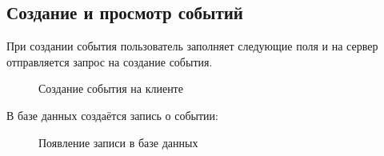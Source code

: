 \documentclass[diploma]{SCWorks}
\begin{document}
\subsection{Создание и просмотр событий}

При создании события пользователь заполняет следующие поля и на сервер 
отправляется запрос на создание события.

\begin{figure}[H]
	\caption{Создание события на клиенте}
	\label{pic:creation-frontend}
\end{figure}

В базе данных создаётся запись о событии:

\begin{figure}[H]
	\caption{Появление записи в базе данных}
	\label{pic:creation-backend}
\end{figure}
\end{document}
